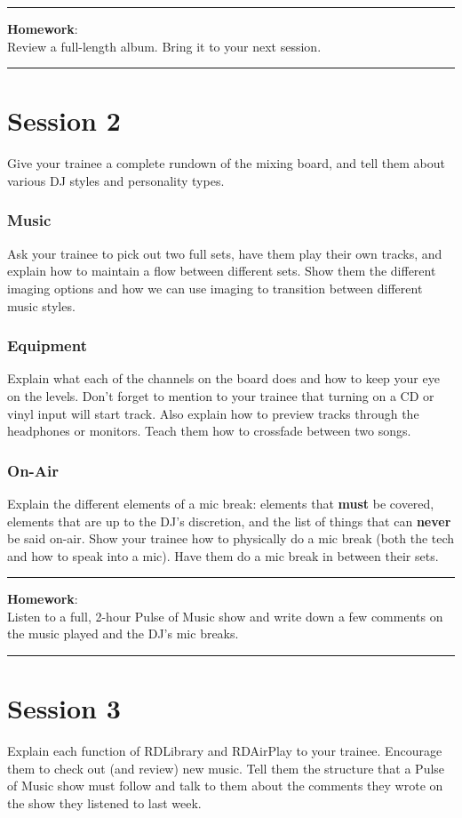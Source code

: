 \documentclass[]{witrman}
\newcommand{\makehomework}[1]{%
\vspace{1mm}
\rule{\textwidth}{1pt}
\textbf{Homework}:\\
#1\\
\rule[2mm]{\textwidth}{1pt}
}
\begin{document}
\makehomework{Review a full-length album.  Bring it to your next session.}


\chapter{Session 2}

Give your trainee a complete rundown of the mixing board, and tell them about
various DJ styles and personality types.

\subsection{Music}

Ask your trainee to pick out two full sets, have them play their own tracks, and
explain how to maintain a flow between different sets.  Show them the different
imaging options and how we can use imaging to transition between different music
styles.

\subsection{Equipment}

Explain what each of the channels on the board does and how to keep your eye on
the levels.  Don't forget to mention to your trainee that turning on a CD or
vinyl input will start track.  Also explain how to preview tracks through the
headphones or monitors.  Teach them how to crossfade between two songs.

\subsection{On-Air}

Explain the different elements of a mic break: elements that \textbf{must} be
covered, elements that are up to the DJ's discretion, and the list of things
that can \textbf{never} be said on-air.  Show your trainee how to physically do
a mic break (both the tech and how to speak into a mic).  Have them do a mic
break in between their sets.

\makehomework{Listen to a full, 2-hour Pulse of Music show and write down a few
comments on the music played and the DJ's mic breaks.}


\chapter{Session 3}

Explain each function of RDLibrary and RDAirPlay to your trainee.  Encourage
them to check out (and review) new music.  Tell them the structure that a Pulse
of Music show must follow and talk to them about the comments they wrote on the
show they listened to last week.
\end{document}
